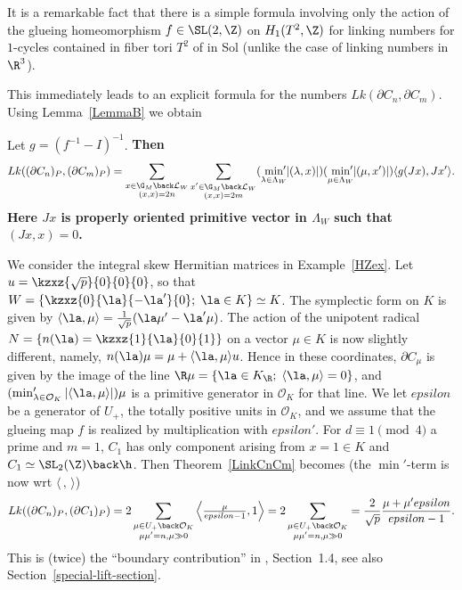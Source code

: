 It is a remarkable fact that there is a simple formula involving
only the action of the
glueing homeomorphism $f \in  \SL(2,\Z)$ on $H_1(T^2, \Z)$ for
linking numbers for $1$-cycles contained in fiber tori $T^2$ of in
Sol (unlike the case of linking numbers in $\R^3$).

This immediately leads to an explicit formula for the numbers
$Lk(\partial C_n, \partial C_m)$. Using Lemma~\ref{LemmaB} we obtain

\begin{theorem}\label{LinkCnCm} 
Let $g = (f^{-1} - I)^{-1}$. \bf{Then}
 \[
 Lk( (\partial C_n)_P, (\partial C_m)_P) = \sum_{ \substack{x\in \G_M \back \mathcal{L}_W \\ (x,x)=2n}} \sum_{\substack{x'\in \G_M \back \mathcal{L}_W \\ (x,x)=2m}} (\min_{\lambda \in \Lambda_W}  {\hspace{-5pt}'}
 |(\lambda,x)|) (\min_{\mu \in \Lambda_W}  {\hspace{-5pt}'}
|(\mu,x')|) \langle g(Jx),Jx' \rangle. 
\]
Here $Jx$ is properly oriented primitive vector in $\Lambda_W$ such that $(Jx,x)=0$. 
 \end{theorem}

 \begin{example}\label{LinkCnCmex} 
We consider the integral skew Hermitian matrices in Example~\ref{HZex}.
Let $u= \kzxz{\sqrt{p}}{0}{0}{0}$, so that $W = \{
\kzxz{0}{\la}{-\la'}{0};\; \la \in K \} \simeq K$. The symplectic
form on $K$ is given by $\langle \la, \mu \rangle = \frac{1}{\sqrt{p}}
(\la \mu' - \la'\mu)$. The action of the unipotent radical $N=
\left\{ n(\la)= \kzxz{1}{\la}{0}{1} \right\}$ on a vector $\mu \in
K$ is now slightly different, namely, $n(\la) \mu = \mu + \langle
\la, \mu \rangle u$. Hence in these coordinates, $\partial C_{\mu}$
is given by the image of the line $\R \mu = \{\la \in K_\R; \;
\langle \la, \mu \rangle =0 \}$, and $(\min'_{\lambda \in \mathcal{O}_K}
 |\langle \la, \mu \rangle|)\mu$ is a primitive generator in
 $\mathcal{O}_K$ for that line. We let $epsilon$ be a generator of
 $U_+$, the totally positive units in $\mathcal{O}_K$, and we assume
 that the glueing map $f$ is realized by multiplication with $epsilon'$.
 For $d \equiv 1 \pmod{4}$ a prime and $m=1$, $C_1$ has only component
 arising from $x =1 \in K$ and $C_1 \simeq \SL_2(\Z) \back \h$.
 Then Theorem~\ref{LinkCnCm} becomes (the $\min'$-term is now wrt
 $\langle\,,\, \rangle$)
\[
 Lk( (\partial C_n)_P, (\partial C_1)_P) = 
 2 \sum_{ \substack{\mu \in U_+ \back \mathcal{O}_K\\ \mu\mu'=n, \mu \gg 0}} \left\langle \tfrac{\mu}{epsilon-1}, 1 \right\rangle = 2\sum_{ \substack{\mu \in U_+ \back \mathcal{O}_K\\ \mu\mu'=n, \mu \gg0}}  = \frac{2}{\sqrt{p}}\frac{\mu+\mu'epsilon}{epsilon-1}.
\]
This is (twice) the ``boundary contribution'' in \cite{HZ},
Section~1.4, see also Section~\ref{special-lift-section}.
\end{example}


